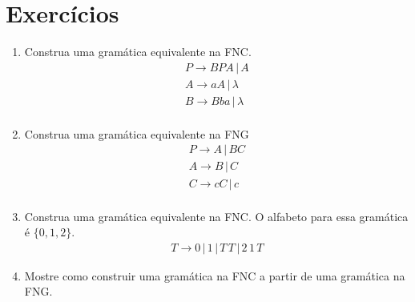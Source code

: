 \documentclass[a4paper]{article}
\theoremstyle{definition}
\begin{document}
  \section{Exercícios} 

  \begin{enumerate}
     \item Construa uma gramática equivalente na FNC.
       \[
         \begin{array}{l}
           P \to BPA \,|\,A \\
           A \to aA \,|\, \lambda\\
           B \to Bba \,|\,\lambda\\
         \end{array}
       \]
     \item Construa uma gramática equivalente na FNG
       \[
         \begin{array}{l}
           P \to A \,|\,BC\\
           A \to B \,|\, C\\
           C \to cC \,|\, c\\
         \end{array}
       \]
     \item Construa uma gramática equivalente na FNC.
       O alfabeto para essa gramática é $\{0,1,2\}$.
       \[
         \begin{array}{l}
           T \to 0\, |\, 1 \,|\, T\,T\,|\,2\,1\,T 
         \end{array}
       \]
     \item Mostre como construir uma gramática na FNC a partir de uma gramática
       na FNG.
  \end{enumerate}
\end{document}
